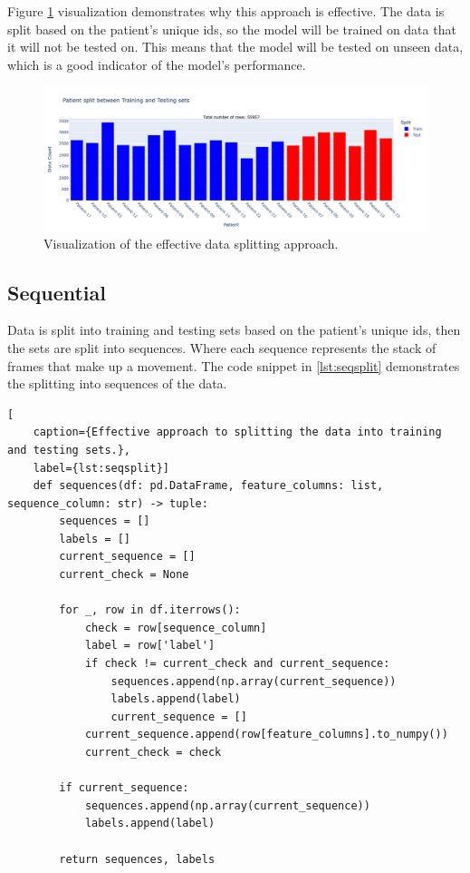             Figure \ref{fig:goodsplit} visualization demonstrates why this approach is effective. The data is split based on the patient's unique ids, so the model will be trained on data that it will not be tested on. This means that the model will be tested on unseen data, which is a good indicator of the model's performance.

            \begin{figure}[H]
                \centering
                \includegraphics[width=1.0\textwidth]{../src/resources/good_split.png}
                \caption{
                    Visualization of the effective data splitting approach.
                }
                \label{fig:goodsplit}
            \end{figure}

    \newpage
            
            \subsection{Sequential} \label{sec:seqsplit}
            Data is split into training and testing sets based on the patient's unique ids, then the sets are split into sequences. Where each sequence represents the stack of frames that make up a movement. The code snippet in \ref{lst:seqsplit} demonstrates the splitting into sequences of the data. 

\begin{lstlisting}[
    caption={Effective approach to splitting the data into training and testing sets.}, 
    label={lst:seqsplit}]                
    def sequences(df: pd.DataFrame, feature_columns: list, sequence_column: str) -> tuple:
        sequences = []
        labels = []
        current_sequence = []
        current_check = None

        for _, row in df.iterrows():
            check = row[sequence_column]
            label = row['label']
            if check != current_check and current_sequence:
                sequences.append(np.array(current_sequence))
                labels.append(label)
                current_sequence = []
            current_sequence.append(row[feature_columns].to_numpy())
            current_check = check

        if current_sequence: 
            sequences.append(np.array(current_sequence))
            labels.append(label)

        return sequences, labels
\end{lstlisting}

